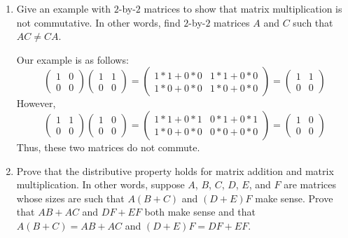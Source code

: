 \documentclass{book}
\begin{document}
\begin{enumerate}
\item Give an example with \(2\)-by-\(2\) matrices to show that matrix multiplication is not commutative.  In other words, find \(2\)-by-\(2\) matrices \(A\) and \(C\) such that \(AC \neq CA\).

Our example is as follows:
\begin{equation*}
\begin{pmatrix}
1 & 0 \\
0 & 0
\end{pmatrix}
\begin{pmatrix}
1 & 1 \\
0 & 0
\end{pmatrix}
=
\begin{pmatrix}
1*1+0*0 & 1*1+0*0 \\
1*0+0*0 & 1*0+0*0
\end{pmatrix}
=
\begin{pmatrix}
1 & 1 \\
0 & 0
\end{pmatrix}
\end{equation*}
However,
\begin{equation*}
\begin{pmatrix}
1 & 1 \\
0 & 0
\end{pmatrix}
\begin{pmatrix}
1 & 0 \\
0 & 0
\end{pmatrix}
=
\begin{pmatrix}
1*1+0*1 & 0*1+0*1 \\
1*0+0*0 & 0*0+0*0
\end{pmatrix}
=
\begin{pmatrix}
1 & 0 \\
0 & 0
\end{pmatrix}
\end{equation*}
Thus, these two matrices do not commute.

\item Prove that the distributive property holds for matrix addition and matrix multiplication.  In other words, suppose \(A\), \(B\), \(C\), \(D\), \(E\), and \(F\) are matrices whose sizes are such that \(A(B+C)\) and \((D+E)F\) make sense.  Prove that \(AB+AC\) and \(DF+EF\) both make sense and that \(A(B+C)=AB+AC\) and \((D+E)F=DF+EF\).


\end{enumerate}
\end{document}
